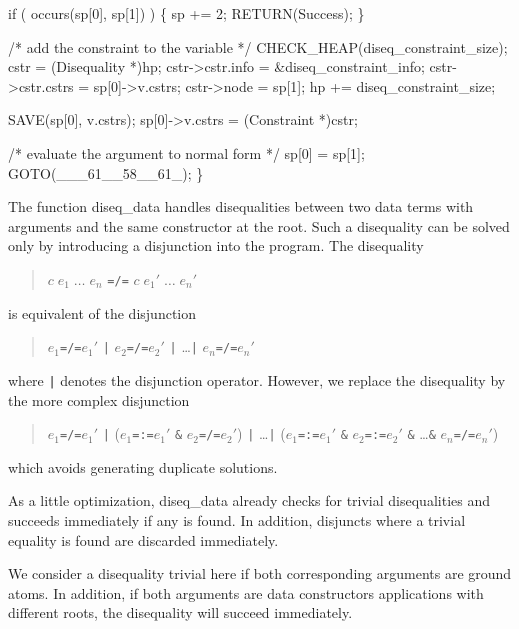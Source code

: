     if ( occurs(sp[0], sp[1]) )
    \{
        sp += 2;
        RETURN(Success);
    \}

    /* add the constraint to the variable */
    CHECK_HEAP(diseq_constraint_size);
    cstr             = (Disequality *)hp;
    cstr->cstr.info  = &diseq_constraint_info;
    cstr->cstr.cstrs = sp[0]->v.cstrs;
    cstr->node       = sp[1];
    hp              += diseq_constraint_size;

    SAVE(sp[0], v.cstrs);
    sp[0]->v.cstrs = (Constraint *)cstr;

    /* evaluate the argument to normal form */
    sp[0] = sp[1];
    GOTO(___61__58__61_);
\}

\nwendcode{}\nwdocspar
The function {\Tt{}diseq{\_}data\nwendquote} handles disequalities between two data terms
with arguments and the same constructor at the root. Such a disequality
can be solved only by introducing a disjunction into the program. The
disequality
\begin{quote}
$c\;e_1\;\dots\;e_n$ \texttt{=/=} $c\;e_1'\;\dots\;e_n'$
\end{quote}
is equivalent of the disjunction
\begin{quote}
$e_1$\texttt{=/=}$e_1'$ \texttt{|}                                           %
$e_2$\texttt{=/=}$e_2'$ \texttt{|} \dots \texttt{|}                          %
$e_n$\texttt{=/=}$e_n'$                                                      %
\end{quote}
where \texttt{|} denotes the disjunction operator. However, we replace
the disequality by the more complex disjunction
\begin{quote}
$e_1$\texttt{=/=}$e_1'$ \texttt{|}                                           %
($e_1$\texttt{=:=}$e_1'$ \texttt{\&} $e_2$\texttt{=/=}$e_2'$)
\texttt{|} \dots \texttt{|}
($e_1$\texttt{=:=}$e_1'$ \texttt{\&} $e_2$\texttt{=:=}$e_2'$
 \texttt{\&} \dots \texttt{\&} $e_n$\texttt{=/=}$e_n'$)                      %
\end{quote}
which avoids generating duplicate solutions.

As a little optimization, {\Tt{}diseq{\_}data\nwendquote} already checks for trivial
disequalities and succeeds immediately if any is found. In addition,
disjuncts where a trivial equality is found are discarded immediately.

We consider a disequality trivial here if both corresponding arguments
are ground atoms. In addition, if both arguments are data constructors
applications with different roots, the disequality will succeed
immediately.

